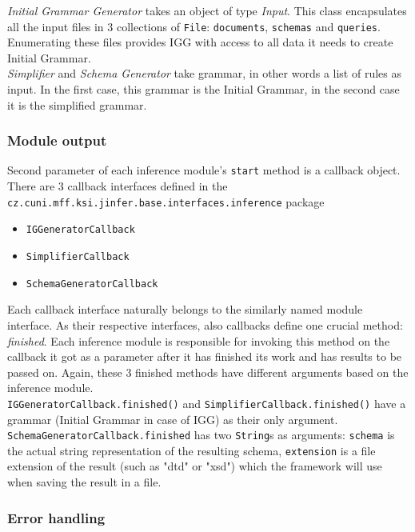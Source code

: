 \documentclass[a4paper,10pt,oneside]{article}
\newcommand{\code}[1]{\texttt{#1}}
\begin{document}
\textit{Initial Grammar Generator} takes an object of type \textit{Input}. This class encapsulates all the input files in 3 collections of \code{File}: \code{documents}, \code{schemas} and \code{queries}. Enumerating these files provides IGG with access to all data it needs to create Initial Grammar.\\

\textit{Simplifier} and \textit{Schema Generator} take grammar, %
in other words a list of rules as input. In the first case, this grammar is the Initial Grammar, in the second case it is the simplified grammar.

\subsubsection{Module output}
Second parameter of each inference module's \code{start} method is a callback object. There are 3 callback interfaces defined in the \code{cz.cuni.mff.ksi.jinfer.base.interfaces.inference} package

\begin{itemize}
	\item \code{IGGeneratorCallback}
	\item \code{SimplifierCallback}
	\item \code{SchemaGeneratorCallback}
\end{itemize}

Each callback interface naturally belongs to the similarly named module interface. As their respective interfaces, also callbacks define one crucial method: \textit{finished}. Each inference module is responsible for invoking this method on the callback it got as a parameter after it has finished its work and has results to be passed on. Again, these 3 finished methods have different arguments based on the inference module.\\

\code{IGGeneratorCallback.finished()} and \code{SimplifierCallback.finished()} have a grammar (Initial Grammar in case of IGG) as their only argument.\\

\code{SchemaGeneratorCallback.finished} has two \code{String}s as arguments: \code{schema} is the actual string representation of the resulting schema, \code{extension} is a file extension of the result (such as "dtd" or "xsd") which the framework will use when saving the result in a file.

\subsubsection{Error handling}
\end{document}
